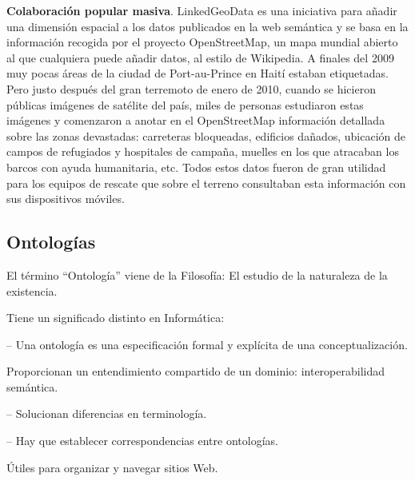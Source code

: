 
\textbf{Colaboración popular masiva}. LinkedGeoData es una iniciativa para añadir una dimensión espacial a los datos publicados en la web semántica y se basa en la información recogida por el proyecto OpenStreetMap, un mapa mundial abierto al que cualquiera puede añadir datos, al estilo de Wikipedia. A finales del 2009 muy pocas áreas de la ciudad de Port-au-Prince en Haití estaban etiquetadas. Pero justo después del gran terremoto de enero de 2010, cuando se hicieron públicas imágenes de satélite del país, miles de personas estudiaron estas imágenes y comenzaron a anotar en el OpenStreetMap información detallada sobre las zonas devastadas: carreteras bloqueadas, edificios dañados, ubicación de campos de refugiados y hospitales de campaña, muelles en los que atracaban los barcos con ayuda humanitaria, etc. Todos estos datos fueron de gran utilidad para los equipos de rescate que sobre el terreno consultaban esta información con sus dispositivos móviles.



\subsection{Ontologías}

El término “Ontología” viene de la Filosofía: El estudio de la naturaleza de la existencia.

Tiene un significado distinto en Informática:

– Una ontología es una especificación formal y explícita de una conceptualización.

Proporcionan un entendimiento compartido de un dominio: interoperabilidad semántica.

– Solucionan diferencias en terminología.

– Hay que establecer correspondencias entre ontologías.

Útiles para organizar y navegar sitios Web.






